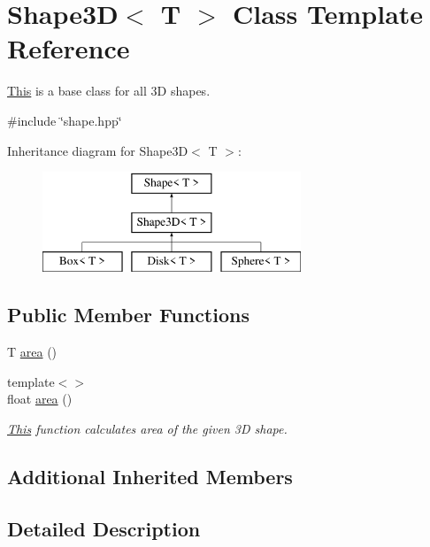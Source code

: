 \hypertarget{classShape3D}{}\section{Shape3D$<$ T $>$ Class Template Reference}
\label{classShape3D}


\mbox{\hyperlink{classThis}{This}} is a base class for all 3D shapes.  




{\ttfamily \#include \char`\"{}shape.\+hpp\char`\"{}}

Inheritance diagram for Shape3D$<$ T $>$\+:\begin{figure}[H]
\begin{center}
\leavevmode
\includegraphics[height=3.000000cm]{classShape3D}
\end{center}
\end{figure}
\subsection*{Public Member Functions}
\begin{DoxyCompactItemize}
\item 
T \mbox{\hyperlink{classShape3D_add8607daa60f43c6cb71e7162c107d71}{area}} ()
\item 
{\footnotesize template$<$$>$ }\\float \mbox{\hyperlink{classShape3D_ae3c7c5cca570561caf09868885bea389}{area}} ()
\begin{DoxyCompactList}\small\item\em \mbox{\hyperlink{classThis}{This}} function calculates area of the given 3D shape. \end{DoxyCompactList}\end{DoxyCompactItemize}
\subsection*{Additional Inherited Members}


\subsection{Detailed Description}
